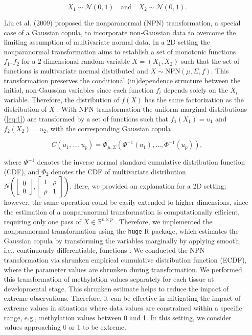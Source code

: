 \documentclass[
	a4paper, %
	10pt, %
	unnumberedsections, %
	twoside, %
]{LTJournalArticle}
\begin{document}
\begin{equation} \label{eq:1}
	X_1 \sim \mathcal{N}(0, 1) \quad \text{and} \quad X_2 \sim \mathcal{N}(0, 1).
\end{equation}

\noindent Liu et al. (2009) \autocite{liu2009a} proposed the nonparanormal 
(NPN) transformation, a special case of a Gaussian copula, to incorporate 
non-Gaussian data to overcome the limiting assumption of multivariate normal data. 
In a 2D setting the nonparanormal transformation aims to establish a set of monotonic 
functions \(f_1, f_2\) for a \(2\)-dimensional random 
variable \(X = (X_1, X_2)\) such 
that the set of functions is multivariate normal distributed 
and \(X \sim \text{NPN}(\mu, \Sigma, f)\). This transformation preserves 
the conditional (in)dependence 
structure between the initial, non-Gaussian variables since each 
function \(f_i\) depends solely on the \(X_i\) variable. Therefore, the 
distribution of \(f(X)\) has the 
same factorization as the distribution of \(X\) \autocite{liu2009a}. 
With NPN transformation the uniform marginal distributions (\ref{eq:1}) are 
transformed by a set of functions such that
\(f_1(X_1) = u_1\) and \(f_2(X_2) = u_2\), with the corresponding Gaussian copula

\begin{equation} \label{eq:2}
	C(u_1, \ldots, u_p) = \Phi_{\mu, \Sigma}(\Phi^{-1}(u_1), \ldots, \Phi^{-1}(u_p)),
\end{equation}

\noindent where $\Phi^{-1}$ denotes the inverse normal standard cumulative 
distribution function (CDF), and $\Phi_2$ denotes the CDF of multivariate distribution 
$N\left(\begin{bmatrix}0 \\ 0\end{bmatrix}, \begin{bmatrix}1 & \rho \\ \rho & 1\end{bmatrix}\right)$. 
Here, we provided an explanation for a 2D setting; 
however, the same operation could be easily extended to higher dimensions, 
since the estimation of a nonparanormal transformation is computationally efficient, 
requiring only one pass of $X \in \mathbb{R}^{n \times p}$ \autocite{jiang2022a}. 
Therefore, we implemented the nonparanormal transformation using the 
\texttt{huge} R package, which 
estimates the Gaussian copula by transforming the variables marginally by 
applying smooth, i.e., continuously differentiable, functions \autocite{jiang2022a}. 
We conducted the NPN transformation via shrunken
empirical cumulative distribution function (ECDF), where the parameter values 
are shrunken during transformation. We performed this transformation of methylation values
separately for each tissue at developmental stage. This shrunken estimate helps to reduce the impact 
of extreme observations. Therefore, 
it can be effective in mitigating the impact of extreme values in situations where 
data values are constrained within a specific range, e.g., methylation values 
between 0 and 1. In this setting, we consider values approaching 0 or 1
to be extreme. 
\end{document}
